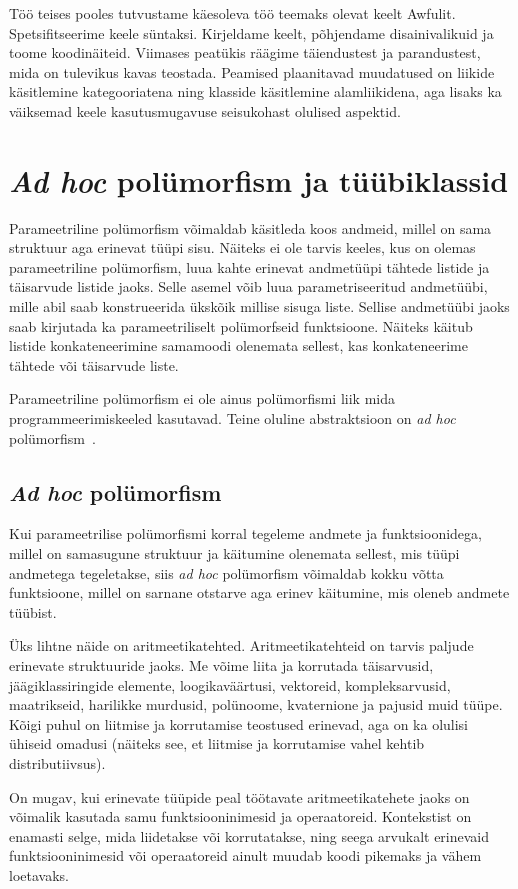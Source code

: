 \documentclass[12pt]{article}
\newcommand\peatykk[1]{
  \clearpage
  \section{#1}}
\begin{document}
    Töö teises pooles tutvustame käesoleva töö teemaks olevat keelt Awfulit. Spetsifitseerime keele süntaksi. Kirjeldame keelt, põhjendame disainivalikuid ja toome koodinäiteid. Viimases peatükis räägime täiendustest ja parandustest, mida on tulevikus kavas teostada. Peamised plaanitavad muudatused on liikide käsitlemine kategooriatena ning klasside käsitlemine alamliikidena, aga lisaks ka väiksemad keele kasutusmugavuse seisukohast olulised aspektid.
  \peatykk{\textit{Ad hoc} polümorfism ja tüübiklassid}
    Parameetriline polümorfism võimaldab käsitleda koos andmeid, millel on sama struktuur aga erinevat tüüpi sisu. Näiteks ei ole tarvis keeles, kus on olemas parameetriline polümorfism, luua kahte erinevat andmetüüpi tähtede listide ja täisarvude listide jaoks. Selle asemel võib luua parametriseeritud andmetüübi, mille abil saab konstrueerida ükskõik millise sisuga liste. Sellise andmetüübi jaoks saab kirjutada ka parameetriliselt polümorfseid funktsioone. Näiteks käitub listide konkateneerimine samamoodi olenemata sellest, kas konkateneerime tähtede või täisarvude liste.

    Parameetriline polümorfism ei ole ainus polümorfismi liik mida programmeerimiskeeled kasutavad. Teine oluline abstraktsioon on \textit{ad hoc} polümorfism~\cite{Fun}.
    \subsection{\textit{Ad hoc} polümorfism}\label{peidetudargumendid}
      Kui parameetrilise polümorfismi korral tegeleme andmete ja funktsioonidega, millel on samasugune struktuur ja käitumine olenemata sellest, mis tüüpi andmetega tegeletakse, siis \textit{ad hoc} polümorfism võimaldab kokku võtta funktsioone, millel on sarnane otstarve aga erinev käitumine, mis oleneb andmete tüübist.

      Üks lihtne näide on aritmeetikatehted. Aritmeetikatehteid on tarvis paljude erinevate struktuuride jaoks. Me võime liita ja korrutada täisarvusid, jäägiklassiringide elemente, loogikaväärtusi, vektoreid, kompleksarvusid, maatrikseid, harilikke murdusid, polünoome, kvaternione ja pajusid muid tüüpe. Kõigi puhul on liitmise ja korrutamise teostused erinevad, aga on ka olulisi ühiseid omadusi (näiteks see, et liitmise ja korrutamise vahel kehtib distributiivsus).

      On mugav, kui erinevate tüüpide peal töötavate aritmeetikatehete jaoks on võimalik kasutada samu funktsiooninimesid ja operaatoreid. Kontekstist on enamasti selge, mida liidetakse või korrutatakse, ning seega arvukalt erinevaid funktsiooninimesid või operaatoreid ainult muudab koodi pikemaks ja vähem loetavaks.
\end{document}
